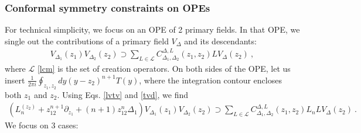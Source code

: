 \documentclass[12pt, a4paper]{article}
\theoremstyle{break}
\begin{document}
\subsubsection{Conformal symmetry constraints on OPEs}\label{sec:csope}

For technical simplicity, we focus on an OPE of 2 primary fields. In that OPE, we single out the contributions of a primary field $V_\Delta$ and its descendants:
\begin{align}
 V_{\Delta_1}(z_1)V_{\Delta_2}(z_2) \supset \sum_{L\in \mathcal{L}} C_{\Delta_1,\Delta_2}^{\Delta, L}(z_1,z_2) LV_\Delta(z_2) \ ,
\end{align}
where $\mathcal{L}$ \eqref{lcm} is the set of creation operators. On both sides of the OPE, let us insert $\frac{1}{2\pi i}\oint_{z_1,z_2} dy (y-z_2)^{n+1}T(y)$, where the integration contour encloses both $z_1$ and $z_2$. Using Eqs. \eqref{lvtv} and \eqref{tvd}, we find
\begin{align}
 \left(L_n^{(z_2)} +z_{12}^{n+1}\partial_{z_1} + (n+1)z_{12}^n\Delta_1\right) V_{\Delta_1}(z_1)V_{\Delta_2}(z_2) \supset \sum_{L\in \mathcal{L}} C_{\Delta_1,\Delta_2}^{\Delta, L}(z_1,z_2)L_nLV_\Delta(z_2) \ .
\end{align}
We focus on 3 cases:
\end{document}
